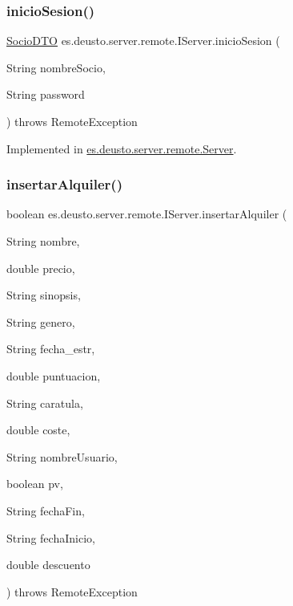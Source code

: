 \subsubsection{\texorpdfstring{inicioSesion()}{inicioSesion()}}
{\footnotesize\ttfamily \mbox{\hyperlink{classes_1_1deusto_1_1server_1_1dto_1_1_socio_d_t_o}{Socio\+D\+TO}} es.\+deusto.\+server.\+remote.\+I\+Server.\+inicio\+Sesion (\begin{DoxyParamCaption}\item[{String}]{nombre\+Socio,  }\item[{String}]{password }\end{DoxyParamCaption}) throws Remote\+Exception}



Implemented in \mbox{\hyperlink{classes_1_1deusto_1_1server_1_1remote_1_1_server_a9202d46c169e1920b585990f1adba486}{es.\+deusto.\+server.\+remote.\+Server}}.

\mbox{\label{interfacees_1_1deusto_1_1server_1_1remote_1_1_i_server_adc798ebfbd387dc7ef9c8d86a37eb3bb}} 
\subsubsection{\texorpdfstring{insertarAlquiler()}{insertarAlquiler()}}
{\footnotesize\ttfamily boolean es.\+deusto.\+server.\+remote.\+I\+Server.\+insertar\+Alquiler (\begin{DoxyParamCaption}\item[{String}]{nombre,  }\item[{double}]{precio,  }\item[{String}]{sinopsis,  }\item[{String}]{genero,  }\item[{String}]{fecha\+\_\+estr,  }\item[{double}]{puntuacion,  }\item[{String}]{caratula,  }\item[{double}]{coste,  }\item[{String}]{nombre\+Usuario,  }\item[{boolean}]{pv,  }\item[{String}]{fecha\+Fin,  }\item[{String}]{fecha\+Inicio,  }\item[{double}]{descuento }\end{DoxyParamCaption}) throws Remote\+Exception}




